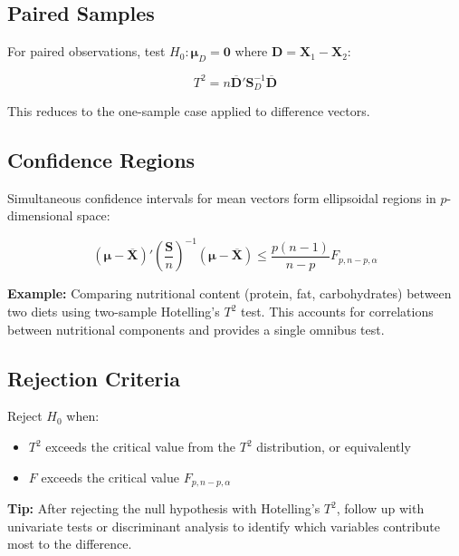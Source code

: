 \documentclass[
]{article}
\begin{document}
\textbf{ }

\subsection{Paired Samples}

For paired observations, test \(H_{0}:\mathbf{\mu}_{D} = \mathbf{0}\)
where \(\mathbf{D} = \mathbf{X}_{1} - \mathbf{X}_{2}\):

\[T^{2} = n\overline{\mathbf{D}}'\mathbf{S}_{D}^{- 1}\overline{\mathbf{D}}\]

This reduces to the one-sample case applied to difference vectors.

\textbf{ }

\subsection{Confidence Regions}

Simultaneous confidence intervals for mean vectors form ellipsoidal
regions in \(p\)-dimensional space:

\[\left( \mathbf{\mu} - \overline{\mathbf{X}} \right)'\left( \frac{\mathbf{S}}{n} \right)^{- 1}\left( \mathbf{\mu} - \overline{\mathbf{X}} \right) \leq \frac{p(n - 1)}{n - p}F_{p,n - p,\alpha}\]

\textbf{Example: } Comparing nutritional content (protein, fat,
carbohydrates) between two diets using two-sample Hotelling's \(T^{2}\)
test. This accounts for correlations between nutritional components and
provides a single omnibus test.

\textbf{ }

\subsection{Rejection Criteria}

Reject \(H_{0}\) when:

\begin{itemize}
\item
  \(T^{2}\) exceeds the critical value from the \(T^{2}\) distribution,
  or equivalently
\item
  \(F\) exceeds the critical value \(F_{p,n - p,\alpha}\)
\end{itemize}

\textbf{Tip: } After rejecting the null hypothesis with Hotelling's
\(T^{2}\), follow up with univariate tests or discriminant analysis to
identify which variables contribute most to the difference.
\end{document}

